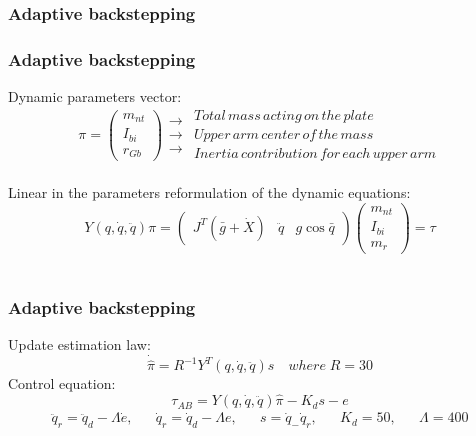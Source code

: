 \subsubsection{Adaptive backstepping}
\begin{frame}
\frametitle{Adaptive backstepping}
Dynamic parameters vector:
\begin{equation*}
\pi =%
\begin{pmatrix}
	m_{nt}\\
	I_{bi}\\
	r_{Gb}
\end{pmatrix}
\begin{array}{c}
	\rightarrow \\
	\rightarrow \\
	\rightarrow
\end{array}
\begin{array}{l}
	Total\, mass\, acting\, on\, the\, plate \\
	Upper\, arm\, center\, of\, the\, mass\, \\
	Inertia\, contribution\, for\, each\, upper\, arm
\end{array}
\end{equation*}\\[8pt]
Linear in the parameters reformulation of the dynamic equations:
\begin{equation*}
Y(q,\dot{q},\ddot{q})\pi=
\begin{pmatrix}
J^T(\bar{g} + \dot{X}) &\ddot{q} &g\cos \bar{q}
\end{pmatrix}
\begin{pmatrix}
	m_{nt}\\ I_{bi}\\ m_r
\end{pmatrix}=\tau
\end{equation*}\\[8pt]
\end{frame}
%
\begin{frame}
\frametitle{Adaptive backstepping}
Update estimation law:
\begin{equation*}
\dot{\hat{\pi}}=R^{-1}Y^T(q,\dot{q},\ddot{q})s\quad where\; R=30
\end{equation*}
Control equation:
\[\tau_{AB} = Y(q,\dot{q},\ddot{q})\hat{\pi} - K_ds - e\]
\begin{align*}
\ddot{q}_r=\ddot{q}_d - \Lambda\dot{e}, && \dot{q}_r=\dot{q}_d - \Lambda e, && s=\dot{q}_ - \dot{q}_r, && K_d=50, && \Lambda=400
\end{align*}
\end{frame}
